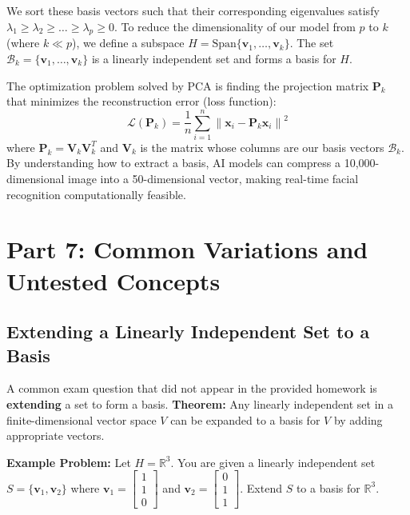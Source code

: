 \documentclass[12pt]{article}
\begin{document}
We sort these basis vectors such that their corresponding eigenvalues satisfy $\lambda_1 \geq \lambda_2 \geq \dots \geq \lambda_p \geq 0$. 
To reduce the dimensionality of our model from $p$ to $k$ (where $k \ll p$), we define a subspace $H = \text{Span}\{\mathbf{v}_1, \dots, \mathbf{v}_k\}$. The set $\mathcal{B}_k = \{\mathbf{v}_1, \dots, \mathbf{v}_k\}$ is a linearly independent set and forms a basis for $H$.

The optimization problem solved by PCA is finding the projection matrix $\mathbf{P}_k$ that minimizes the reconstruction error (loss function):
\[ \mathcal{L}(\mathbf{P}_k) = \frac{1}{n} \sum_{i=1}^n \left\| \mathbf{x}_i - \mathbf{P}_k \mathbf{x}_i \right\|^2 \]
where $\mathbf{P}_k = \mathbf{V}_k \mathbf{V}_k^T$ and $\mathbf{V}_k$ is the matrix whose columns are our basis vectors $\mathcal{B}_k$. By understanding how to extract a basis, AI models can compress a 10,000-dimensional image into a 50-dimensional vector, making real-time facial recognition computationally feasible.

\newpage
\section{Part 7: Common Variations and Untested Concepts}

\subsection{Extending a Linearly Independent Set to a Basis}
A common exam question that did not appear in the provided homework is \textbf{extending} a set to form a basis. 
\textbf{Theorem:} Any linearly independent set in a finite-dimensional vector space $V$ can be expanded to a basis for $V$ by adding appropriate vectors.

\textbf{Example Problem:} Let $H = \mathbb{R}^3$. You are given a linearly independent set $S = \{\mathbf{v}_1, \mathbf{v}_2\}$ where $\mathbf{v}_1 = \begin{bmatrix} 1 \\ 1 \\ 0 \end{bmatrix}$ and $\mathbf{v}_2 = \begin{bmatrix} 0 \\ 1 \\ 1 \end{bmatrix}$. Extend $S$ to a basis for $\mathbb{R}^3$.
\end{document}
